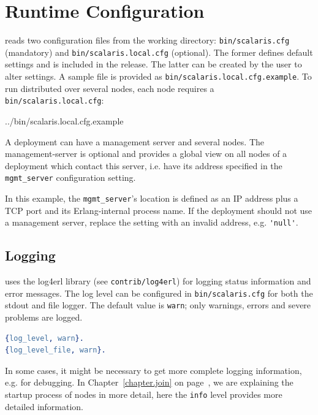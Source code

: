 \documentclass[a4paper]{scrreprt}
\newcommand{\codefile}[3][language=erlang]{
{

{#3}
}
}
\newcommand{\sieheref}[1]{\ref{#1} on page~\pageref{#1}}
\newcommand{\code}[1]{\lstinline[basicstyle=\ttfamily]!#1!}
\newcommand{\filetitle}[1]{\hbox to \linewidth{~~File \code{#1:}\hfill}}
\begin{document}
\section{Runtime Configuration}

\scalaris{} reads two configuration files from the working directory:
\code{bin/scalaris.cfg} (mandatory) and \code{bin/scalaris.local.cfg}
(optional). The former defines default settings and is included in the
release. The latter can be created by the user to alter settings.  A
sample file is provided as \code{bin/scalaris.local.cfg.example}. To run
\scalaris{} distributed over several nodes, each node requires a
\code{bin/scalaris.local.cfg}:

\codefile{scalaris.local.cfg}{../bin/scalaris.local.cfg.example}

A \scalaris{} deployment can have a management server and several nodes. The
management-server is optional and provides a global view on all nodes of a
\scalaris{} deployment which contact this server, i.e. have its address
specified in the \code{mgmt_server} configuration setting.

In this example, the \code{mgmt_server}'s location is defined as
an IP address plus a TCP port and its Erlang-internal process name.
If the deployment should not use a management server, replace the setting with
an invalid address, e.g. \code{'null'}.

\subsection{Logging}
\label{sec:logging}

\scalaris{} uses the log4erl library (see \code{contrib/log4erl}) for
logging status information and error messages. The log level can be
configured in \code{bin/scalaris.cfg} for both the stdout and file logger.
The default value is {\tt warn}; only warnings, errors and severe problems are
logged.

\begin{lstlisting}[language=erlang]
%% @doc Loglevel: debug < info < warn < error < fatal < none
{log_level, warn}.
{log_level_file, warn}.
\end{lstlisting}

In some cases, it might be necessary to get more complete logging
information, e.g. for debugging. In Chapter~\sieheref{chapter.join},
we are explaining the startup process of \scalaris{} nodes in more
detail, here the {\tt info} level provides more detailed information.
\end{document}
